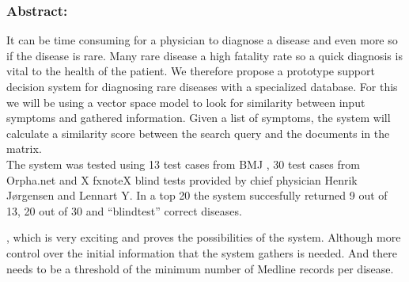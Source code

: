 \subsubsection*{Abstract:}

It can be time consuming for a physician to diagnose a disease and
even more so if the disease is rare. Many rare disease a high fatality
rate so a quick diagnosis is vital to the health of the patient. We
therefore propose a prototype support decision system for diagnosing
rare diseases with a specialized database. For this we will be using a
vector space model to look for similarity between input symptoms and
gathered information. Given a list of symptoms, the system will
calculate a similarity score between the search query and the
documents in the matrix. \\


The system was tested using 13 test cases from
BMJ \cite{HangwiTang11102006}, 30 test cases from Orpha.net and X fxnote{X}
blind tests provided by chief physician Henrik Jørgensen and Lennart Y. 
In a top 20 the system succesfully returned 9 out of 13, 20 out of 30 
and ``blindtest'' correct diseases.

, which is very exciting and proves the
possibilities of the system. Although more control over the initial
information that the system gathers is needed. And there needs to be a
threshold of the minimum number of Medline records per disease.\\
